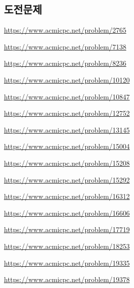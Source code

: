 \subsection{도전문제}
\begin{problem} \url{https://www.acmicpc.net/problem/2765} \end{problem}
\begin{problem} \url{https://www.acmicpc.net/problem/7138} \end{problem}
\begin{problem} \url{https://www.acmicpc.net/problem/8236} \end{problem}
\begin{problem} \url{https://www.acmicpc.net/problem/10120} \end{problem}
\begin{problem} \url{https://www.acmicpc.net/problem/10847} \end{problem}
\begin{problem} \url{https://www.acmicpc.net/problem/12752} \end{problem}
\begin{problem} \url{https://www.acmicpc.net/problem/13145} \end{problem}
\begin{problem} \url{https://www.acmicpc.net/problem/15004} \end{problem}
\begin{problem} \url{https://www.acmicpc.net/problem/15208} \end{problem}
\begin{problem} \url{https://www.acmicpc.net/problem/15292} \end{problem}
\begin{problem} \url{https://www.acmicpc.net/problem/16312} \end{problem}
\begin{problem} \url{https://www.acmicpc.net/problem/16606} \end{problem}
\begin{problem} \url{https://www.acmicpc.net/problem/17719} \end{problem}
\begin{problem} \url{https://www.acmicpc.net/problem/18253} \end{problem}
\begin{problem} \url{https://www.acmicpc.net/problem/19335} \end{problem}
\begin{problem} \url{https://www.acmicpc.net/problem/19378} \end{problem}
